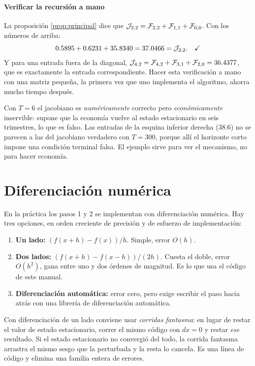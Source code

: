 \paragraph{Verificar la recursión a mano} La proposición \ref{prop:principal}
dice que $\mathcal{J}_{2,2} = \mathcal{F}_{2,2}+\mathcal{F}_{1,1}+\mathcal{F}_{0,0}$. Con los números de arriba:
\begin{equation}
0.5895 + 0.6231 + 35.8340 = 37.0466 = \mathcal{J}_{2,2}. \quad\checkmark
\end{equation}
Y para una entrada fuera de la diagonal,
$\mathcal{J}_{4,2} = \mathcal{F}_{4,2}+\mathcal{F}_{3,1}+\mathcal{F}_{2,0} = 36.4377$, que es exactamente la entrada
correspondiente. Hacer esta verificación a mano con una matriz pequeña, la
primera vez que uno implementa el algoritmo, ahorra mucho tiempo después.

\begin{trampa}
Con $T=6$ el jacobiano es \emph{numéricamente} correcto pero
\emph{económicamente} inservible: supone que la economía vuelve al estado
estacionario en seis trimestres, lo que es falso. Las entradas de la esquina
inferior derecha ($38.6$) no se parecen a las del jacobiano verdadero con
$T=300$, porque allí el horizonte corto impone una condición terminal falsa. El
ejemplo sirve para ver el mecanismo, no para hacer economía.
\end{trampa}

\section{Diferenciación numérica}

En la práctica los pasos 1 y 2 se implementan con diferenciación numérica. Hay
tres opciones, en orden creciente de precisión y de esfuerzo de implementación:

\begin{enumerate}[leftmargin=1.4em]
\item \textbf{Un lado:} $(f(x+h)-f(x))/h$. Simple, error $O(h)$.
\item \textbf{Dos lados:} $(f(x+h)-f(x-h))/(2h)$. Cuesta el doble, error
$O(h^2)$, gana entre uno y dos órdenes de magnitud. Es lo que usa el código de
este manual.
\item \textbf{Diferenciación automática:} error cero, pero exige escribir el
paso hacia atrás con una librería de diferenciación automática.
\end{enumerate}

\begin{trampa}
Con diferenciación de un lado conviene usar \emph{corridas fantasma}: en lugar de
restar el valor de estado estacionario, correr el mismo código con $dx=0$ y
restar \emph{ese} resultado. Si el estado estacionario no convergió del todo, la
corrida fantasma arrastra el mismo sesgo que la perturbada y la resta lo cancela.
Es una línea de código y elimina una familia entera de errores.
\end{trampa}

